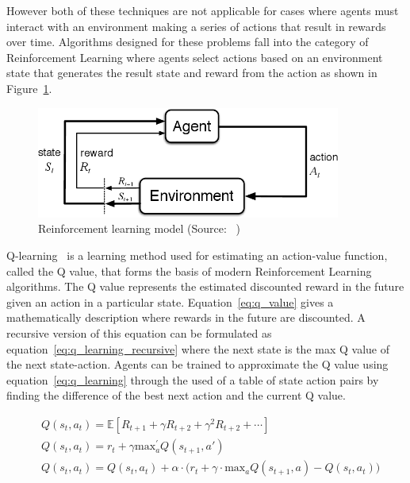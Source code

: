 However both of these techniques are not applicable for cases where agents must interact with an environment making a
series of actions that result in rewards over time. Algorithms designed for these problems fall into the category of
Reinforcement Learning where agents select actions based on an environment state that generates the result state and
reward from the action as shown in Figure~\ref{fig:reinforcement_learning}.

\begin{figure}[h]
    \centering
    \includegraphics[width=10cm]{figures/2_background_lit_figs/agent_env_interaction.png}
    \caption{Reinforcement learning model (Source: ~\cite{Sutton1998})}
    \label{fig:reinforcement_learning}
\end{figure}

Q-learning~\citep{watkins1992q-learning} is a learning method used for estimating an action-value function,
called the Q value, that forms the basis of modern Reinforcement Learning algorithms. The Q value represents the
estimated discounted reward in the future given an action in a particular state. Equation~\eqref{eq:q_value} gives a
mathematically description where rewards in the future are discounted. A recursive version of this equation can be
formulated as equation~\eqref{eq:q_learning_recursive} where the next state is the max Q value of the next state-action.
Agents can be trained to approximate the Q value using equation~\eqref{eq:q_learning} through the used of a table
of state action pairs by finding the difference of the best next action and the current Q value.

\begin{align}
    & Q(s_t, a_t) = \mathbb{E} \left[R_{t+1} + \gamma R_{t+2} + \gamma^2 R_{t+2} + \cdots \right] \label{eq:q_value} \\
    & Q(s_t, a_t) = r_t + \gamma \text{max}_a^{'} Q(s_{t+1}, a') \label{eq:q_learning_recursive} \\
    & Q(s_t, a_t) = Q(s_t, a_t) + \alpha \cdot \big( r_t + \gamma \cdot \text{max}_a Q(s_{t+1} , a) - Q(s_t, a_t) \big) \label{eq:q_learning}
\end{align}


